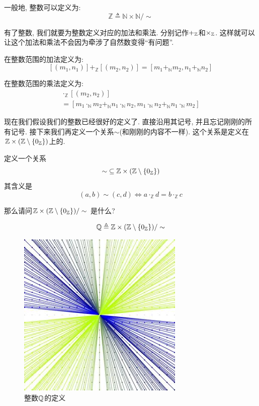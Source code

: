 \begin{definition}[$\mathbb{Z}$]
一般地, 整数可以定义为: 
  \[
    \mathbb{Z} \triangleq \mathbb{N} \times \mathbb{N}/\sim
  \]
\end{definition}

有了整数, 我们就要为整数定义对应的加法和乘法. 分别记作$+_{\mathbb{Z}}$和$\times_{\mathbb{Z}}$. 这样就可以让这个加法和乘法不会因为牵涉了自然数变得``有问题''. 

\begin{definition}[$+_\mathbb{Z}$]
在整数范围的加法定义为: 
  \[
    [(m_1, n_1)] +_{\mathbb{Z}} [(m_2, n_2)] = [m_1 +_{\mathbb{N}} m_2, n_1 +_{\mathbb{N}} n_2]
  \]
\end{definition}

\begin{definition}
在整数范围的乘法定义为: 
  \begin{gather*}
    [(m_1, n_1)] \cdot_{\mathbb{Z}} [(m_2, n_2)] \\
    = [m_1 \cdot_{\mathbb{N}} m_2 +_{\mathbb{N}} n_1 \cdot_{\mathbb{N}} n_2,
       m_1 \cdot_{\mathbb{N}} n_2 +_{\mathbb{N}} n_1 \cdot_{\mathbb{N}} m_2]
  \end{gather*}
\end{definition}

现在我们假设我们的整数已经很好的定义了. 直接沿用其记号, 并且忘记刚刚的所有记号. 接下来我们再定义一个关系$\sim$(和刚刚的内容不一样). 这个关系是定义在$\mathbb{Z}\times (\mathbb{Z} \setminus \{0_{\mathbb{Z}}\})$上的. 

\begin{definition}
定义一个关系
  \[
    \sim\; \subseteq \mathbb{Z} \times (\mathbb{Z} \setminus \{0_{\mathbb{Z}}\})
  \]
其含义是
  \[
    (a, b) \sim (c, d) \iff a \cdot_{\mathbb{Z}} d = b \cdot_{\mathbb{Z}} c
  \]
\end{definition}

那么请问$\mathbb{Z} \times (\mathbb{Z} \setminus \{0_{\mathbb{Z}}\})/\sim$ 是什么? 


\begin{definition}[$\mathbb{Q}$]
  \[
    \mathbb{Q} \triangleq \mathbb{Z} \times (\mathbb{Z} \setminus \{0_{\mathbb{Z}}\})/\sim
  \]
\end{definition}

\begin{figure}
	\centering
	\includegraphics[scale=0.5]{3-set-theory/figs/qdef}
	
	\caption{整数$\mathbb{Q}$的定义}
	\label{fig:zdef}
\end{figure}

